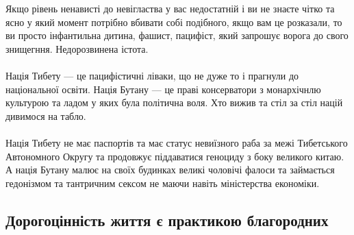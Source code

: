 \\
\\
Якщо рівень ненависті до невігластва у вас недостатній і ви не знаєте чітко та ясно
у який момент потрібно вбивати собі подібного, якщо вам це розказали, то ви просто
інфантильна дитина, фашист, пацифіст, який запрошує ворога до свого знищегння. Недорозвинена істота.
\\
\\
Нація Тибету --- це пацифістичні ліваки, що не дуже то і прагнули до національної освіти.
Нація Бутану --- це праві консерватори з монархічнлю культурою та ладом у яких була політична воля.
Хто вижив та стіл за стіл націй дивимося на табло.
\\
\\
Нація Тибету не має паспортів та має статус невиїзного раба за межі Тибетського Автономного Округу та
продовжує піддаватися геноциду з боку великого китаю. А нація Бутану малює на своїх будинках
великі чоловічі фалоси та займається гедонізмом та тантричним сексом не маючи навіть міністерства економіки.

\subsection{Дорогоцінність життя є практикою благородних}

